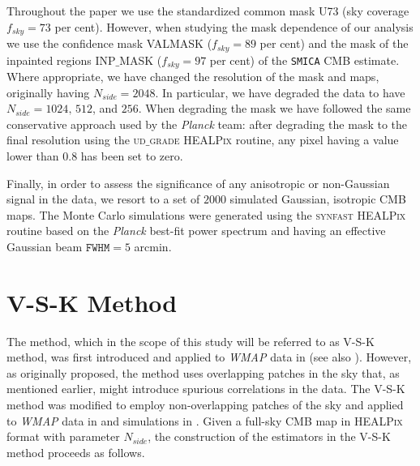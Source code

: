 Throughout the paper we use the standardized common mask U73 (sky coverage $f_{sky} = 73$ per cent). However, when studying the mask dependence of our analysis we use the confidence mask VALMASK ($f_{sky} = 89$ per cent) and the mask of the inpainted regions INP$\_$MASK ($f_{sky} = 97$ per cent) of the \texttt{SMICA} CMB estimate. Where appropriate, we have changed the resolution of the mask and maps, originally having $N_{side}=2048$. In particular, we have degraded the data to have $N_{side}=1024,\, 512$, and $256$. When degrading the mask we have followed the same conservative approach used by the \textit{Planck} team: after degrading the mask to the final resolution using the \textsc{ud$\_$grade HEALPix} routine, any pixel having a value lower than $0.8$ has been set to zero. 

Finally, in order to assess the significance of any anisotropic or non-Gaussian signal in the data, we resort to a set of $2000$ simulated Gaussian, isotropic CMB maps. The Monte Carlo simulations were generated using the \textsc{synfast HEALPix} routine based on the \textit{Planck} best-fit power spectrum and having an effective Gaussian beam $\texttt{FWHM}=5$ arcmin.

\section{V-S-K Method}
\label{s:method}

The method, which in the scope of this study will be referred to as V-S-K method, was first introduced and applied to \textit{WMAP} data in \cite{Bernui2009}  (see also \cite{Bernui2010,Bernui2012}). However, as originally proposed, the method uses overlapping patches in the sky that, as mentioned earlier, might introduce spurious correlations in the data. The V-S-K method was modified to employ non-overlapping patches of the sky and applied to \textit{WMAP} data in \cite{Cardona2012} and simulations in \cite{Cardona2013}. Given a full-sky CMB map in \textsc{HEALPix} format with parameter $N_{side}$, the construction of the estimators in the V-S-K method proceeds as follows. 

